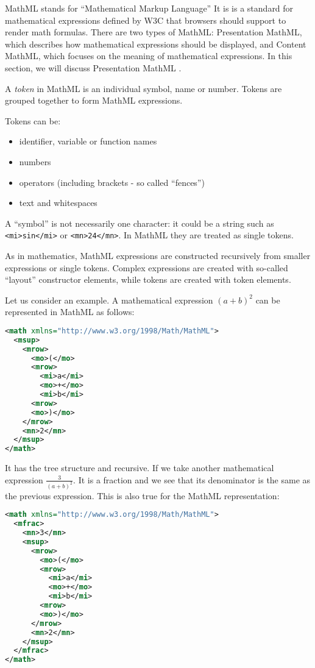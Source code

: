 MathML \cite{mathml} stands for ``Mathematical Markup Language''
It is is a standard for mathematical
expressions defined by W3C that browsers should support to render math
formulas. There are two types of MathML: Presentation MathML, which describes
how mathematical expressions should be displayed, and Content MathML, which
focuses on the meaning of mathematical expressions. In this section, we will discuss
Presentation MathML .


A \emph{token} in MathML is an individual symbol, name or number. Tokens
are grouped together to form MathML expressions.

Tokens can be:

\begin{itemize}
\itemsep1pt\parskip0pt
\item identifier, variable or function names
\item numbers
\item operators (including brackets - so called ``fences'')
\item text and whitespaces
\end{itemize}

A ``symbol'' is not necessarily one character: it could be a string such
as \texttt{<mi>sin</mi>} or \texttt{<mn>24</mn>}. 
In MathML they are treated as single tokens.


As in mathematics, MathML expressions are constructed recursively from
smaller expressions or single tokens. Complex expressions are created
with so-called ``layout'' constructor elements, while tokens are created
with token elements.

Let us consider an example. A mathematical expression $(a + b)^2$
can be represented in MathML as follows:

\begin{lstlisting}[language=XML,caption={TODO},label={}]
<math xmlns="http://www.w3.org/1998/Math/MathML">
  <msup>
    <mrow>
      <mo>(</mo>
      <mrow>
        <mi>a</mi>
        <mo>+</mo>
        <mi>b</mi>
      <mrow>
      <mo>)</mo>
    </mrow>
    <mn>2</mn>
  </msup>
</math>
\end{lstlisting}


It has the tree structure and recursive. If we take another mathematical
expression $\frac{3}{(a + b)^2}$. It is a
fraction and we see that its denominator is the same as the previous
expression. This is also true for the MathML representation:

\begin{lstlisting}[language=XML,caption={TODO},label={}]
<math xmlns="http://www.w3.org/1998/Math/MathML">
  <mfrac>
    <mn>3</mn>
    <msup>
      <mrow>
        <mo>(</mo>
        <mrow>
          <mi>a</mi>
          <mo>+</mo>
          <mi>b</mi>
        <mrow>
        <mo>)</mo>
      </mrow>
      <mn>2</mn>
    </msup>
  </mfrac>
</math>
\end{lstlisting}


